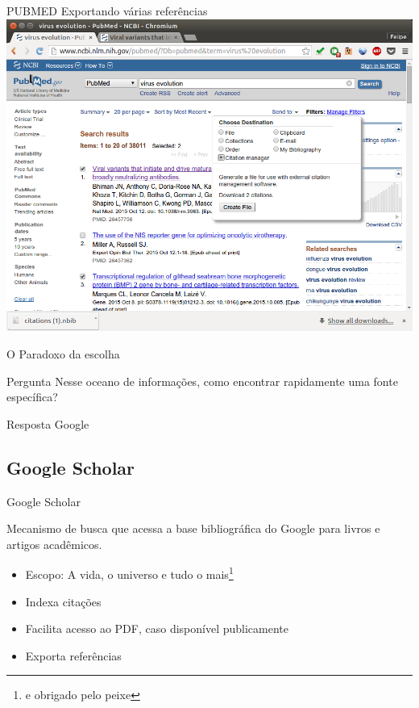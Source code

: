 \documentclass{beamer}
\begin{document}
\begin{frame}{PUBMED Exportando várias referências}
  \includegraphics[height=.85\textheight]{Busca/pubmed-export2}
\end{frame}

\begin{frame}{O Paradoxo da escolha}
  \begin{block}{Pergunta}
    Nesse oceano de informações, como encontrar rapidamente uma fonte
    específica?
  \end{block}
  \begin{block}{Resposta}
    Google
  \end{block}
\end{frame}

\subsection{Google Scholar}

\begin{frame}{Google Scholar}
  \begin{definition}
    Mecanismo de busca que acessa a base bibliográfica do Google para
    livros e artigos acadêmicos.
  \end{definition}
  \begin{itemize}
  \item Escopo: A vida, o universo e tudo o mais\footnote{e obrigado
      pelo peixe}
  \item Indexa citações
  \item Facilita acesso ao PDF, caso disponível publicamente
  \item Exporta referências
  \end{itemize}
\end{frame}
\end{document}
